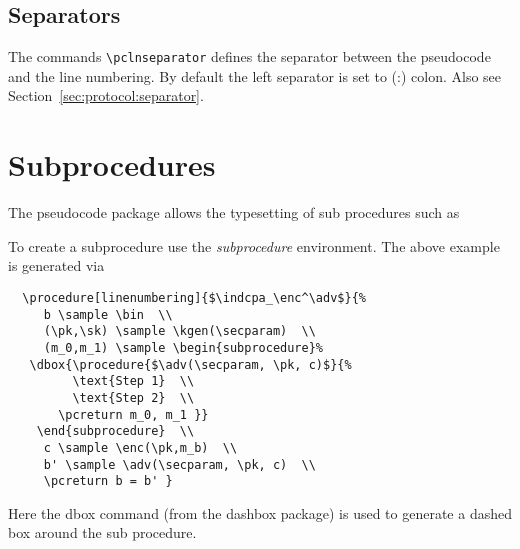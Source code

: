 \documentclass[a4paper]{report}
\begin{document}
  \subsection{Separators}
  The commands \lstinline$\pclnseparator$ defines the separator between the pseudocode and the line numbering. By
  default the left separator is set to (:) colon. Also see Section~\ref{sec:protocol:separator}.
  
  
  \section{Subprocedures}
  The pseudocode package allows the typesetting of sub procedures such as
  
  \begin{center}
   \end{center}
   
  To create a subprocedure use the \emph{subprocedure} environment. The above example is generated via
   \begin{lstlisting}
  \procedure[linenumbering]{$\indcpa_\enc^\adv$}{%
	 b \sample \bin  \\
	 (\pk,\sk) \sample \kgen(\secparam)  \\
	 (m_0,m_1) \sample \begin{subprocedure}%
   \dbox{\procedure{$\adv(\secparam, \pk, c)$}{%
		 \text{Step 1}  \\
		 \text{Step 2}  \\
	   \pcreturn m_0, m_1 }}
	\end{subprocedure}  \\
	 c \sample \enc(\pk,m_b)  \\
	 b' \sample \adv(\secparam, \pk, c)  \\
	 \pcreturn b = b' }
  \end{lstlisting}
  Here the dbox command (from the dashbox package) is used to generate a dashed box around the sub procedure. 
  
\end{document}
